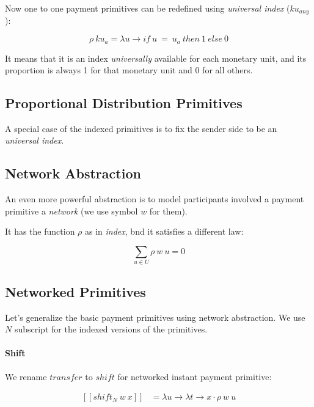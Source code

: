 Now one to one payment primitives can be redefined using \textit{universal index} ($ku_{any}$):

\begin{equation}
    \rho\ ku_{a} = \lambda u \rightarrow if\ u\ =\ u_a\ then\ 1\ else\ 0
\end{equation}

It means that it is an index \textit{universally} available for each monetary unit, and its
proportion is always 1 for that monetary unit and 0 for all others.

\subsection{Proportional Distribution Primitives}

A special case of the indexed primitives is to fix the sender side to be an \textit{universal index}.

\subsection{Network Abstraction}

An even more powerful abstraction is to model participants involved a payment primitive
a \textit{network} (we use symbol $w$ for them).

It has the function $\rho$ as in \textit{index}, bnd it satisfies a different law:

\begin{equation}
    \displaystyle \sum_{u \in U} \rho\ w\ u = 0
\end{equation}

\subsection{Networked Primitives}

Let's generalize the basic payment primitives using network abstraction. We use $N$ subscript for
the indexed versions of the primitives.

\paragraph{Shift}

We rename $transfer$ to $shift$ for networked instant payment primitive:

\begin{equation}
    \begin{split}
        [\![shift_N\ w\ x]\!] &=
        \lambda u \rightarrow \lambda t \rightarrow x \cdot \rho\ w\ u
    \end{split}
\end{equation}


